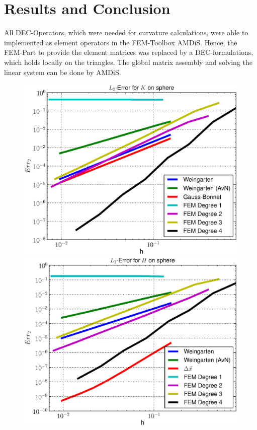 \documentclass[a2paper]{scrartcl}
\begin{document}
\section*{Results and Conclusion}
All DEC-Operators, which were needed for curvature calculations, were able to implemented as element operators in the FEM-Toolbox AMDiS.
Hence, the FEM-Part to provide the element matrices was replaced by a DEC-formulations, which holds locally on the triangles.
The global matrix assembly and solving the linear system can be done by AMDiS.
\begin{figure}[h!]
    \begin{minipage}[t]{0.24\textwidth}
       \centering\includegraphics[width=\textwidth]{bilder/sphere/ErrKL2.eps}
    \end{minipage}\hfill
    \begin{minipage}[t]{0.24\textwidth}
       \centering\includegraphics[width=\textwidth]{bilder/sphere/ErrHL2.eps}

\end{minipage}
\end{figure}
\end{document}
